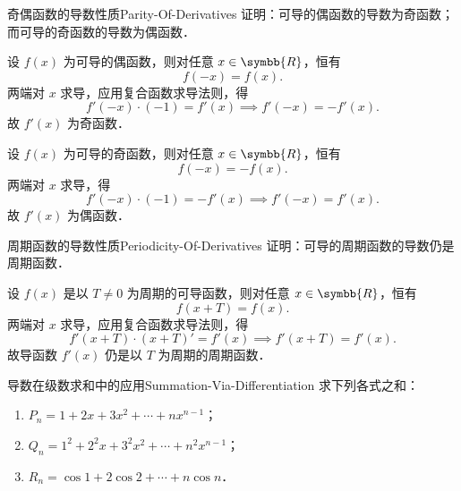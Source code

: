 \begin{problem}{奇偶函数的导数性质}{Parity-Of-Derivatives}
    证明：可导的偶函数的导数为奇函数；而可导的奇函数的导数为偶函数．
\end{problem}

\begin{myproof}
    设 $f(x)$ 为可导的偶函数，则对任意 $x \in \symbb{R}$，恒有
    \begin{equation}
        f(-x) = f(x).
    \end{equation}
    两端对 $x$ 求导，应用复合函数求导法则，得
    \begin{equation}
        f'(-x) \cdot (-1) = f'(x) \implies f'(-x) = -f'(x).
    \end{equation}
    故 $f'(x)$ 为奇函数．

    设 $f(x)$ 为可导的奇函数，则对任意 $x \in \symbb{R}$，恒有
    \begin{equation}
        f(-x) = -f(x).
    \end{equation}
    两端对 $x$ 求导，得
    \begin{equation}
        f'(-x) \cdot (-1) = -f'(x) \implies f'(-x) = f'(x).
    \end{equation}
    故 $f'(x)$ 为偶函数．
\end{myproof}

\begin{problem}{周期函数的导数性质}{Periodicity-Of-Derivatives}
    证明：可导的周期函数的导数仍是周期函数．
\end{problem}

\begin{myproof}
    设 $f(x)$ 是以 $T \neq 0$ 为周期的可导函数，则对任意 $x \in \symbb{R}$，恒有
    \begin{equation}
        f(x + T) = f(x).
    \end{equation}
    两端对 $x$ 求导，应用复合函数求导法则，得
    \begin{equation}
        f'(x + T) \cdot (x + T)' = f'(x) \implies f'(x + T) = f'(x).
    \end{equation}
    故导函数 $f'(x)$ 仍是以 $T$ 为周期的周期函数．
\end{myproof}

\begin{problem}{导数在级数求和中的应用}{Summation-Via-Differentiation}
    求下列各式之和：
    \begin{enumerate}
        \item $P_n = 1 + 2x + 3x^2 + \cdots + nx^{n-1}$；
        \item $Q_n = 1^2 + 2^2 x + 3^2 x^2 + \cdots + n^2 x^{n-1}$；
        \item $R_n = \cos 1 + 2\cos 2 + \cdots + n\cos n$．
    \end{enumerate}
\end{problem}

